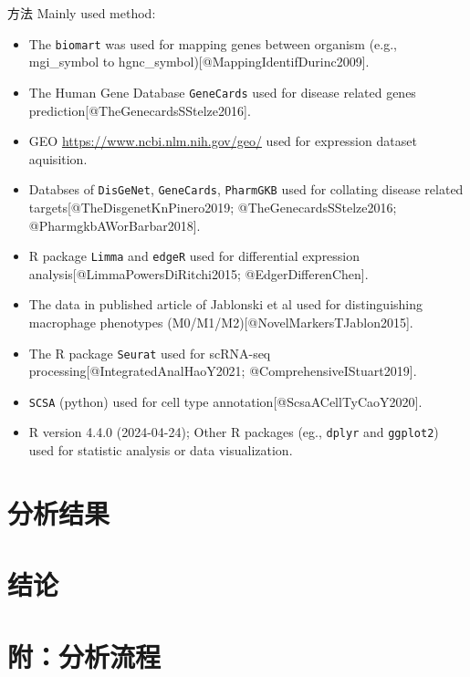 \documentclass[
  ignorenonframetext,
]{beamer}
\providecommand{\tightlist}{%
  \setlength{\itemsep}{0pt}\setlength{\parskip}{0pt}}
\begin{document}
\begin{frame}[fragile]{方法}
\protect\hypertarget{ux65b9ux6cd5}{}
Mainly used method:

\begin{itemize}
\tightlist
\item
  The \texttt{biomart} was used for mapping genes between organism
  (e.g., mgi\_symbol to hgnc\_symbol){[}@MappingIdentifDurinc2009{]}.
\item
  The Human Gene Database \texttt{GeneCards} used for disease related
  genes prediction{[}@TheGenecardsSStelze2016{]}.
\item
  GEO \url{https://www.ncbi.nlm.nih.gov/geo/} used for expression
  dataset aquisition.
\item
  Databses of \texttt{DisGeNet}, \texttt{GeneCards}, \texttt{PharmGKB}
  used for collating disease related targets{[}@TheDisgenetKnPinero2019;
  @TheGenecardsSStelze2016; @PharmgkbAWorBarbar2018{]}.
\item
  R package \texttt{Limma} and \texttt{edgeR} used for differential
  expression analysis{[}@LimmaPowersDiRitchi2015; @EdgerDifferenChen{]}.
\item
  The data in published article of Jablonski et al used for
  distinguishing macrophage phenotypes
  (M0/M1/M2){[}@NovelMarkersTJablon2015{]}.
\item
  The R package \texttt{Seurat} used for scRNA-seq
  processing{[}@IntegratedAnalHaoY2021; @ComprehensiveIStuart2019{]}.
\item
  \texttt{SCSA} (python) used for cell type
  annotation{[}@ScsaACellTyCaoY2020{]}.
\item
  R version 4.4.0 (2024-04-24); Other R packages (eg., \texttt{dplyr}
  and \texttt{ggplot2}) used for statistic analysis or data
  visualization.
\end{itemize}
\end{frame}

\hypertarget{results}{%
\section{分析结果}\label{results}}

\hypertarget{dis}{%
\section{结论}\label{dis}}

\hypertarget{workflow}{%
\section{附：分析流程}\label{workflow}}
\end{document}

